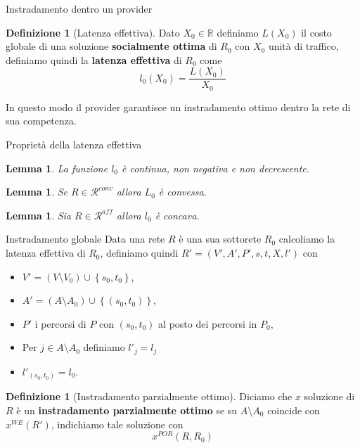 \documentclass{beamer}
\newcounter{counter1}
\theoremstyle{plain}
\newtheorem{mylem}[counter1]{Lemma}
\theoremstyle{definition}
\newtheorem{mydef}[counter1]{Definizione}
\theoremstyle{remark}
\newcommand{\set}[1]{\left\{#1\right\}}
\newcommand{\pa}[1]{\left(#1\right)}
\begin{document}
\begin{frame}{Instradamento dentro un provider}
  \begin{mydef}[Latenza effettiva]
    Dato $X_0\in\mathbb{R}$ definiamo $L\pa{X_0}$ il costo globale di
    una soluzione \textbf{socialmente ottima} di $R_0$ con $X_0$ unità
    di traffico, definiamo quindi la \textbf{latenza effettiva} di
    $R_0$ come
    \[ l_0(X_0) = \frac{L\pa{X_0}}{X_0} \]
  \end{mydef}
  In questo modo il provider garantisce un instradamento ottimo dentro
  la rete di sua competenza.
\end{frame}
\begin{frame}{Proprietà della latenza effettiva}
  \begin{mylem}
    La funzione $l_0$ è continua, non negativa e non decrescente.
  \end{mylem}
  \begin{mylem}
    Se $R\in \mathcal{R}^{conv}$ allora $L_0$ è convessa.
  \end{mylem}
  \begin{mylem}
    Sia $R\in \mathcal{R}^{aff}$ allora $l_0$ è concava.
  \end{mylem}
\end{frame}

\begin{frame}{Instradamento globale}
  Data una rete $R$ è una sua sottorete $R_0$ calcoliamo la latenza
  effettiva di $R_0$, definiamo quindi $R'=(V',A',P',s,t,X,l')$ con
  \begin{itemize}
  \item $V' = \pa{V\setminus V_0}\cup \set{s_0,t_0}$,
  \item $A' = \pa{A\setminus A_0}\cup \set{\pa{s_0,t_0}}$,
  \item $P'$ i percorsi di $P$ con $\pa{s_0,t_0}$ al posto dei
    percorsi in $P_0$,
  \item Per $j\in A\setminus A_0$ definiamo $l'_j = l_j$
  \item $l'_{\pa{s_0,t_0}} = l_0$.
  \end{itemize}

  \begin{mydef}[Instradamento parzialmente ottimo]
    Diciamo che $x$ soluzione di $R$ è un \textbf{instradamento
      parzialmente ottimo} se su $A\setminus A_0$ coincide con
    $x^{WE}(R')$, indichiamo tale soluzione con
    \[ x^{POR}(R,R_0) \]
  \end{mydef}
\end{frame}
\end{document}
